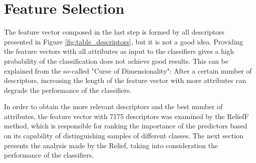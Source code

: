 \documentclass[conference]{IEEEtran}
\begin{document}
	\section{Feature Selection}
        \par The feature vector composed in the last step is formed by all descriptors presented in Figure \ref{fig:table_descriptors}, but it is not a good idea. Providing the feature vectors with all attributes as input to the classifiers gives a high probability of the classification does not achieve good results. This can be explained from the so-called "Curse of Dimensionality": After a certain number of descriptors, increasing the length of the feature vector with more attributes can degrade the performance of the classifiers.
		\par In order to obtain the more relevant descriptors and the best number of attributes, the feature vector with 7175 descriptors was examined by the ReliefF method, which is responsible for ranking the importance of the predictors based on its capability of distinguishing samples of different classes. The next section presents the analysis made by the Relief, taking into consideration the performance of the classifiers.
\end{document}
